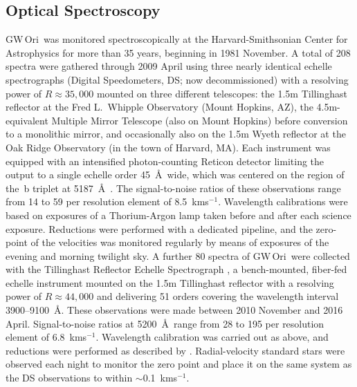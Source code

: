 \documentclass[twocolumn]{aastex61}
\newcommand\kms{\ifmmode{\rm km\thinspace s^{-1}}\else km\thinspace s$^{-1}$\fi}
\newcommand{\gw}{GW\,Ori}
\begin{document}
\subsection{Optical Spectroscopy \label{sec:spectroscopy}}

\gw\ was monitored spectroscopically at the Harvard-Smithsonian Center for Astrophysics for more than 35 years, beginning in 1981 November. A total of 208 spectra were gathered through 2009 April using three nearly identical echelle spectrographs (Digital Speedometers, DS; now decommissioned) with a resolving power of $R \approx 35,000$ mounted on three different telescopes: the 1.5m Tillinghast reflector at the Fred L.\ Whipple Observatory (Mount Hopkins, AZ), the 4.5m-equivalent Multiple Mirror Telescope (also on Mount Hopkins) before conversion to a monolithic mirror, and occasionally also on the 1.5m Wyeth reflector at the Oak Ridge Observatory (in the town of Harvard, MA).  Each instrument was equipped with an intensified photon-counting Reticon detector limiting the output to a single echelle order 45~\AA\ wide, which was centered on the region of the \,b triplet at 5187~\AA\ \citep[see][]{latham92}. The signal-to-noise ratios of these observations range from 14 to 59 per resolution element of 8.5~\kms. Wavelength calibrations were based on exposures of a Thorium-Argon lamp taken before and after each science exposure. Reductions were performed with a dedicated pipeline, and the zero-point of the velocities was monitored regularly by means of exposures of the evening and morning twilight sky. A further 80 spectra of \gw\ were collected with the Tillinghast Reflector Echelle Spectrograph \citep[TRES;][]{furesz08}, a bench-mounted, fiber-fed echelle instrument mounted on the 1.5m Tillinghast reflector with a resolving power of $R \approx 44,000$ and delivering 51 orders covering the wavelength interval 3900--9100~\AA. These observations were made between 2010 November and 2016 April.  Signal-to-noise ratios at 5200~\AA\ range from 28 to 195 per resolution element of 6.8~\kms. Wavelength calibration was carried out as above, and reductions were performed as described by \cite{buchhave10}. Radial-velocity standard stars were observed each night to monitor the zero point and place it on the same system as the DS observations to within $\sim$0.1~\kms.
\end{document}
